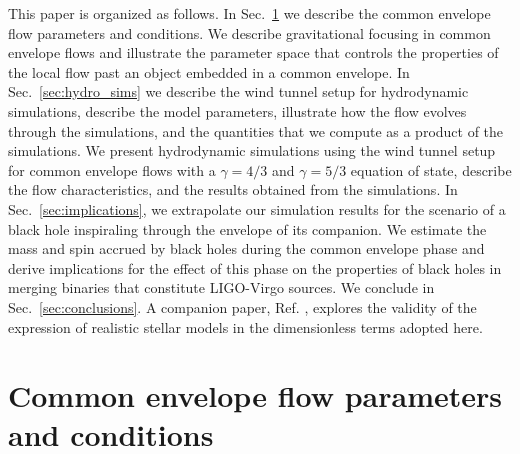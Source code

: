 This paper is organized as follows. In Sec.~\ref{sec:CE_params} we describe the common envelope flow parameters and conditions. We describe gravitational focusing in common envelope flows and illustrate the parameter space that controls the properties of the local flow past an object embedded in a common envelope. In Sec.~\ref{sec:hydro_sims} we describe the wind tunnel setup for hydrodynamic simulations, describe the model parameters, illustrate how the flow evolves through the simulations, and the quantities that we compute as a product of the simulations. We present hydrodynamic simulations using the wind tunnel setup for common envelope flows with a $\gamma = 4/3$ and $\gamma = 5/3$ equation of state, describe the flow characteristics, and the results obtained from the simulations. In Sec.~\ref{sec:implications}, we extrapolate our simulation results for the scenario of a black hole inspiraling through the envelope of its companion. We estimate the mass and spin accrued by black holes during the common envelope phase and derive implications for the effect of this phase on the properties of black holes in merging binaries that constitute LIGO-Virgo sources.
We conclude in Sec.~\ref{sec:conclusions}. A companion paper, Ref. \cite{Rosa:2020}, explores the validity of the expression of realistic stellar models in the dimensionless terms adopted here.

\vspace{5mm}
\section{Common envelope flow parameters and conditions}\label{sec:CE_params} 

